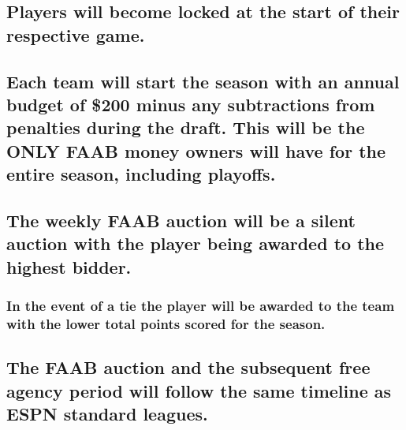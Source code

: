 \documentclass[
]{book}
\begin{document}
\hypertarget{players-will-become-locked-at-the-start-of-their-respective-game.}{%
\subsection{Players will become locked at the start of their respective game.}\label{players-will-become-locked-at-the-start-of-their-respective-game.}}

\hypertarget{each-team-will-start-the-season-with-an-annual-budget-of-200-minus-any-subtractions-from-penalties-during-the-draft.-this-will-be-the-only-faab-money-owners-will-have-for-the-entire-season-including-playoffs.}{%
\subsection{Each team will start the season with an annual budget of \$200 minus any subtractions from penalties during the draft. This will be the ONLY FAAB money owners will have for the entire season, including playoffs.}\label{each-team-will-start-the-season-with-an-annual-budget-of-200-minus-any-subtractions-from-penalties-during-the-draft.-this-will-be-the-only-faab-money-owners-will-have-for-the-entire-season-including-playoffs.}}

\hypertarget{the-weekly-faab-auction-will-be-a-silent-auction-with-the-player-being-awarded-to-the-highest-bidder.}{%
\subsection{The weekly FAAB auction will be a silent auction with the player being awarded to the highest bidder.}\label{the-weekly-faab-auction-will-be-a-silent-auction-with-the-player-being-awarded-to-the-highest-bidder.}}

\hypertarget{in-the-event-of-a-tie-the-player-will-be-awarded-to-the-team-with-the-lower-total-points-scored-for-the-season.}{%
\subsubsection{In the event of a tie the player will be awarded to the team with the lower total points scored for the season.}\label{in-the-event-of-a-tie-the-player-will-be-awarded-to-the-team-with-the-lower-total-points-scored-for-the-season.}}

\hypertarget{the-faab-auction-and-the-subsequent-free-agency-period-will-follow-the-same-timeline-as-espn-standard-leagues.}{%
\subsection{The FAAB auction and the subsequent free agency period will follow the same timeline as ESPN standard leagues.}\label{the-faab-auction-and-the-subsequent-free-agency-period-will-follow-the-same-timeline-as-espn-standard-leagues.}}
\end{document}
